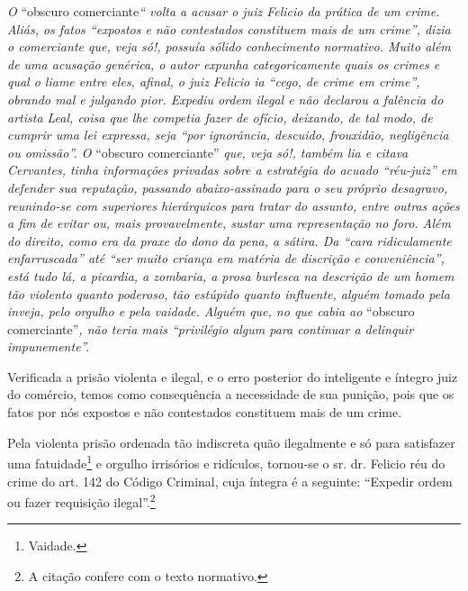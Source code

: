 \begin{didascalia}
\emph{O} ``obscuro comerciante\emph{`` volta a acusar o juiz Felicio da
prática de um crime. Aliás, os fatos ``expostos e não contestados
constituem mais de um crime'', dizia o comerciante que, veja só!, possuía
sólido conhecimento normativo. Muito além de uma acusação genérica, o
autor expunha categoricamente quais os crimes e qual o liame entre eles,
afinal, o juiz Felicio ia ``cego, de crime em crime'', obrando mal e
julgando pior. Expediu ordem ilegal e não declarou a falência do artista
Leal, coisa que lhe competia fazer de ofício, deixando, de tal modo, de
cumprir uma lei expressa, seja ``por ignorância, descuido, frouxidão,
negligência ou omissão''. O} ``obscuro comerciante'' \emph{que, veja só!,
também lia e citava Cervantes, tinha informações privadas sobre a
estratégia do acuado ``réu-juiz'' em defender sua reputação, passando
abaixo-assinado para o seu próprio desagravo, reunindo-se com superiores
hierárquicos para tratar do assunto, entre outras ações a fim de evitar
ou, mais provavelmente, sustar uma representação no foro. Além do
direito, como era da praxe do dono da pena, a sátira. Da ``cara
ridiculamente enfarruscada'' até ``ser muito criança em matéria de
discrição e conveniência'', está tudo lá, a picardia, a zombaria, a prosa
burlesca na descrição de um homem tão violento quanto poderoso, tão
estúpido quanto influente, alguém tomado pela inveja, pelo orgulho e
pela vaidade. Alguém que, no que cabia ao} ``obscuro comerciante''\emph{,
não teria mais ``privilégio algum para continuar a delinquir
impunemente''.}
\end{didascalia}

\asterisc{}

Verificada a prisão violenta e ilegal, e o erro posterior do inteligente
e íntegro juiz do comércio, temos como consequência a necessidade de sua
punição, pois que os fatos por nós expostos e não contestados constituem
mais de um crime.

Pela violenta prisão ordenada tão indiscreta quão ilegalmente e só para
satisfazer uma fatuidade\footnote{ Vaidade.} e orgulho irrisórios e
ridículos, tornou-se o sr. dr. Felicio réu do crime do art. 142 do
Código Criminal, cuja íntegra é a seguinte: ``Expedir ordem ou fazer
requisição ilegal''.\footnote{ A citação confere com o texto normativo.}


